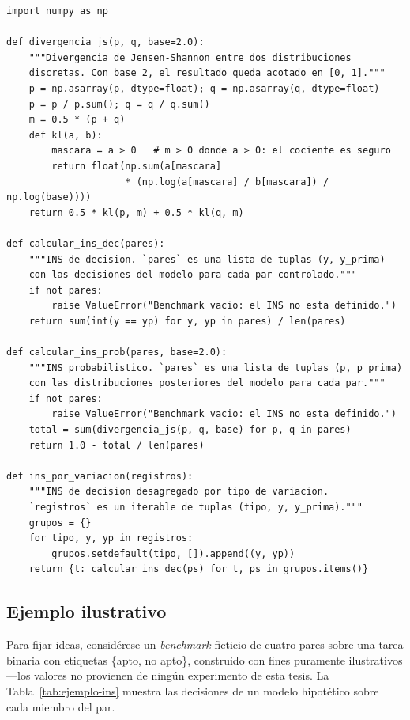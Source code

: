 \begin{lstlisting}[caption={Implementación de referencia del cálculo del \INS.},label={lst:ins-ref}]
import numpy as np

def divergencia_js(p, q, base=2.0):
    """Divergencia de Jensen-Shannon entre dos distribuciones
    discretas. Con base 2, el resultado queda acotado en [0, 1]."""
    p = np.asarray(p, dtype=float); q = np.asarray(q, dtype=float)
    p = p / p.sum(); q = q / q.sum()
    m = 0.5 * (p + q)
    def kl(a, b):
        mascara = a > 0   # m > 0 donde a > 0: el cociente es seguro
        return float(np.sum(a[mascara]
                     * (np.log(a[mascara] / b[mascara]) / np.log(base))))
    return 0.5 * kl(p, m) + 0.5 * kl(q, m)

def calcular_ins_dec(pares):
    """INS de decision. `pares` es una lista de tuplas (y, y_prima)
    con las decisiones del modelo para cada par controlado."""
    if not pares:
        raise ValueError("Benchmark vacio: el INS no esta definido.")
    return sum(int(y == yp) for y, yp in pares) / len(pares)

def calcular_ins_prob(pares, base=2.0):
    """INS probabilistico. `pares` es una lista de tuplas (p, p_prima)
    con las distribuciones posteriores del modelo para cada par."""
    if not pares:
        raise ValueError("Benchmark vacio: el INS no esta definido.")
    total = sum(divergencia_js(p, q, base) for p, q in pares)
    return 1.0 - total / len(pares)

def ins_por_variacion(registros):
    """INS de decision desagregado por tipo de variacion.
    `registros` es un iterable de tuplas (tipo, y, y_prima)."""
    grupos = {}
    for tipo, y, yp in registros:
        grupos.setdefault(tipo, []).append((y, yp))
    return {t: calcular_ins_dec(ps) for t, ps in grupos.items()}
\end{lstlisting}

\subsection{Ejemplo ilustrativo}

Para fijar ideas, considérese un \emph{benchmark} ficticio de cuatro pares
sobre una tarea binaria con etiquetas \{apto, no apto\}, construido con fines
puramente ilustrativos ---los valores no provienen de ningún experimento de
esta tesis. La Tabla~\ref{tab:ejemplo-ins} muestra las decisiones de un
modelo hipotético sobre cada miembro del par.

